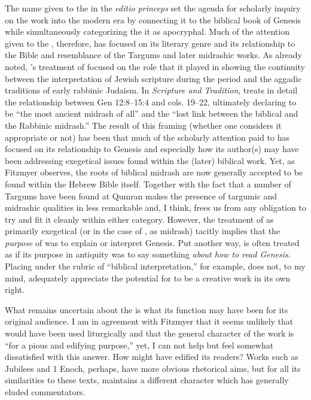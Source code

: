 The name given to the \ga in the \emph{editio princeps} set the agenda for scholarly inquiry on the work into the modern era by connecting it to the biblical book of Genesis while simultaneously categorizing the it as apocryphal. Much of the attention given to the \ga, therefore, has focused on its literary genre and its relationship to the Bible and resemblance of the Targums and later midrashic works. As already noted, \vermes's treatment of \ga focused on the role that it played in showing the continuity between the interpretation of Jewish scripture during the \secondtemple period and the aggadic traditions of early rabbinic Judaism. In \emph{Scripture and Tradition}, \vermes treats in detail the relationship between Gen 12:8--15:4 and \ga cols. 19--22, ultimately declaring \ga to be ``the most ancient midrash of all'' and the ``lost link between the biblical and the Rabbinic midrash.''\autocite[124]{vermes1961} The result of this framing (whether one considers it appropriate or not) has been that much of the scholarly attention paid to \ga has focused on its relationship to Genesis and especially how its author(s) may have been addressing exegetical issues found within the (later) biblical work. Yet, as Fitzmyer observes, the roots of biblical midrash are now generally accepted to be found within the Hebrew Bible itself. Together with the fact that a number of Targums have been found at Qumran makes the presence of targumic and midrashic qualities in \ga less remarkable and, I think, frees us from any obligation to try and fit it cleanly within either category.\autocite[20]{fitzmyer2004} However, the treatment of \ga as primarily exegetical (or in the case of \vermes, as midrash) tacitly implies that the \emph{purpose} of \ga was to explain or interpret Genesis. Put another way, \ga is often treated as if its purpose in antiquity was to say something \emph{about how to read Genesis}. Placing \ga under the rubric of ``biblical interpretation,'' for example, does not, to my mind, adequately appreciate the potential for \ga to be a creative work in its own right.

What remains uncertain about the \ga is what its function may have been for its original audience. I am in agreement with Fitzmyer that it seems unlikely that \ga would have been used liturgically and that the general character of the work is ``for a pious and edifying purpose,''\autocite[20]{fitzmyer2004} yet, I can not help but feel somewhat dissatisfied with this answer. How might \ga have edified its readers? Works such as Jubilees and 1 Enoch, perhaps, have more obvious rhetorical aims, but for all its similarities to these texts, \ga maintains a different character which has generally eluded commentators.

